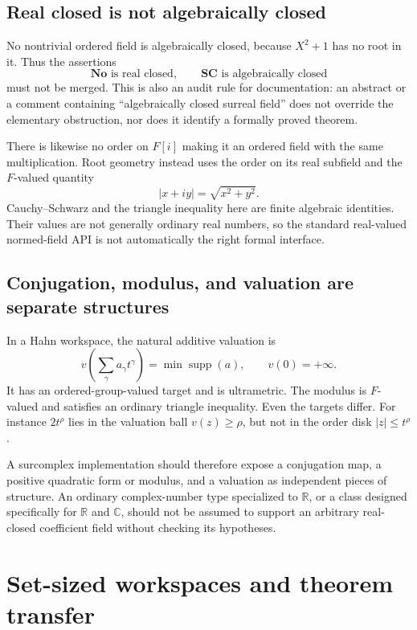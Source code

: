 \documentclass[11pt,letterpaper]{article}
\numberwithin{equation}{section}
\theoremstyle{definition}
\theoremstyle{remark}
\newcommand{\No}{\mathbf{No}}
\newcommand{\SC}{\mathbf{SC}}
\newcommand{\R}{\mathbb R}
\newcommand{\C}{\mathbb C}
\newcommand{\supp}{\operatorname{supp}}
\begin{document}
\subsection{Real closed is not algebraically closed}
No nontrivial ordered field is algebraically closed, because $X^2+1$ has no root in it. Thus the assertions
\[
\No\text{ is real closed},\qquad \SC\text{ is algebraically closed}
\]
must not be merged. This is also an audit rule for documentation: an abstract or a comment containing ``algebraically closed surreal field'' does not override the elementary obstruction, nor does it identify a formally proved theorem.

There is likewise no order on $F[i]$ making it an ordered field with the same multiplication. Root geometry instead uses the order on its real subfield and the $F$-valued quantity
\[
|x+iy|=\sqrt{x^2+y^2}.
\]
Cauchy--Schwarz and the triangle inequality here are finite algebraic identities. Their values are not generally ordinary real numbers, so the standard real-valued normed-field API is not automatically the right formal interface.

\subsection{Conjugation, modulus, and valuation are separate structures}
In a Hahn workspace, the natural additive valuation is
\[
v\left(\sum_\gamma a_\gamma t^\gamma\right)=\min\supp(a),\qquad v(0)=+\infty.
\]
It has an ordered-group-valued target and is ultrametric. The modulus is $F$-valued and satisfies an ordinary triangle inequality. Even the targets differ. For instance $2t^\rho$ lies in the valuation ball $v(z)\ge\rho$, but not in the order disk $|z|\le t^\rho$.

A surcomplex implementation should therefore expose a conjugation map, a positive quadratic form or modulus, and a valuation as independent pieces of structure. An ordinary complex-number type specialized to $\R$, or a class designed specifically for $\R$ and $\C$, should not be assumed to support an arbitrary real-closed coefficient field without checking its hypotheses.

\section{Set-sized workspaces and theorem transfer}\label{sec:workspaces}
\end{document}
